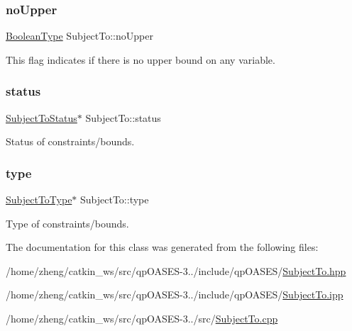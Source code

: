 \subsubsection{\texorpdfstring{no\+Upper}{noUpper}}
{\footnotesize\ttfamily \hyperlink{_types_8hpp_a20f82124c82b6f5686a7fce454ef9089}{Boolean\+Type} Subject\+To\+::no\+Upper\hspace{0.3cm}{\ttfamily [protected]}}

This flag indicates if there is no upper bound on any variable. \mbox{\label{class_subject_to_a704f3dcdc56f92bc5b80fbc77a240824}} 
\subsubsection{\texorpdfstring{status}{status}}
{\footnotesize\ttfamily \hyperlink{_types_8hpp_a70a6a40d261a015ead8d43aa589383a4}{Subject\+To\+Status}$\ast$ Subject\+To\+::status\hspace{0.3cm}{\ttfamily [protected]}}

Status of constraints/bounds. \mbox{\label{class_subject_to_aad4d39d990754d086c85d04f3ec42e68}} 
\subsubsection{\texorpdfstring{type}{type}}
{\footnotesize\ttfamily \hyperlink{_types_8hpp_a3e65c061dde41562d1aeb2c4453bf1d3}{Subject\+To\+Type}$\ast$ Subject\+To\+::type\hspace{0.3cm}{\ttfamily [protected]}}

Type of constraints/bounds. 

The documentation for this class was generated from the following files\+:\begin{DoxyCompactItemize}
\item 
/home/zheng/catkin\+\_\+ws/src/qp\+O\+A\+S\+E\+S-\/3../include/qp\+O\+A\+S\+E\+S/\hyperlink{_subject_to_8hpp}{Subject\+To.\+hpp}\item 
/home/zheng/catkin\+\_\+ws/src/qp\+O\+A\+S\+E\+S-\/3../include/qp\+O\+A\+S\+E\+S/\hyperlink{_subject_to_8ipp}{Subject\+To.\+ipp}\item 
/home/zheng/catkin\+\_\+ws/src/qp\+O\+A\+S\+E\+S-\/3../src/\hyperlink{_subject_to_8cpp}{Subject\+To.\+cpp}\end{DoxyCompactItemize}
